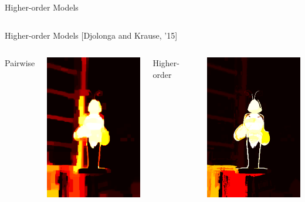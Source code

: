 \documentclass[mathserif]{beamer}
\newcommand{\qcite}[1]{{\scriptsize\color{col2}[#1]}}
\begin{document}
\begin{frame}{Higher-order Models}
\begin{columns}[c]


\end{columns}
\end{frame}

\begin{frame}{Higher-order Models \qcite{Djolonga and Krause, '15}}
\vspace{0.5em}
\begin{columns}[c]
\centering
\strut Pairwise

\vspace{0.3em}
\centering
\includegraphics[width=1.8in]{figures/bee_dr1.png}

\centering
\strut Higher-order

\vspace{0.3em}
\centering
\includegraphics[width=1.8in]{figures/bee_marginals.png}
\end{columns}
\end{frame}
\end{document}
